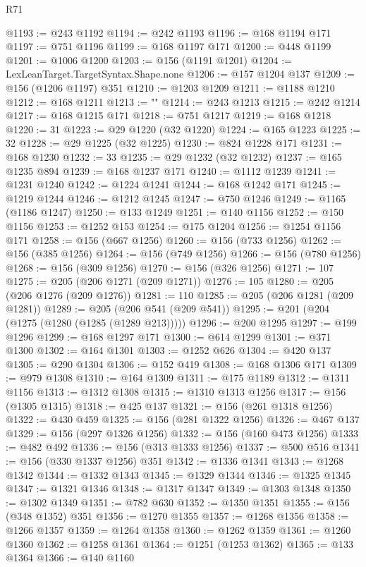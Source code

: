 \begin{lexlean}{R71}
\begin{coremodule}
{@1193 := @243 @1192
@1194 := @242 @1193
@1196 := @168 @1194 @171
@1197 := @751 @1196
@1199 := @168 @1197 @171
@1200 := @448 @1199
@1201 := @1006 @1200
@1203 := @156 (@1191 @1201)
@1204 := LexLeanTarget.TargetSyntax.Shape.none
@1206 := @157 @1204 @137
@1209 := @156 (@1206 @1197) @351
@1210 := @1203 @1209
@1211 := @1188 @1210
@1212 := @168 @1211
@1213 := "}"
@1214 := @243 @1213
@1215 := @242 @1214
@1217 := @168 @1215 @171
@1218 := @751 @1217
@1219 := @168 @1218
@1220 := 31
@1223 := @29 @1220 (@32 @1220)
@1224 := @165 @1223
@1225 := 32
@1228 := @29 @1225 (@32 @1225)
@1230 := @824 @1228 @171
@1231 := @168 @1230
@1232 := 33
@1235 := @29 @1232 (@32 @1232)
@1237 := @165 @1235 @894
@1239 := @168 @1237 @171
@1240 := @1112 @1239
@1241 := @1231 @1240
@1242 := @1224 @1241
@1244 := @168 @1242 @171
@1245 := @1219 @1244
@1246 := @1212 @1245
@1247 := @750 @1246
@1249 := @1165 (@1186 @1247)
@1250 := @133 @1249
@1251 := @140 @1156
@1252 := @150 @1156
@1253 := @1252 @153
@1254 := @175 @1204
@1256 := @1254 @1156 @171
@1258 := @156 (@667 @1256)
@1260 := @156 (@733 @1256)
@1262 := @156 (@385 @1256)
@1264 := @156 (@749 @1256)
@1266 := @156 (@780 @1256)
@1268 := @156 (@309 @1256)
@1270 := @156 (@326 @1256)
@1271 := 107
@1275 := @205 (@206 @1271 (@209 @1271))
@1276 := 105
@1280 := @205 (@206 @1276 (@209 @1276))
@1281 := 110
@1285 := @205 (@206 @1281 (@209 @1281))
@1289 := @205 (@206 @541 (@209 @541))
@1295 := @201 (@204 (@1275 (@1280 (@1285 (@1289 @213)))))
@1296 := @200 @1295
@1297 := @199 @1296
@1299 := @168 @1297 @171
@1300 := @614 @1299
@1301 := @371 @1300
@1302 := @164 @1301
@1303 := @1252 @626
@1304 := @420 @137
@1305 := @290 @1304
@1306 := @152 @419
@1308 := @168 @1306 @171
@1309 := @979 @1308
@1310 := @164 @1309
@1311 := @175 @1189
@1312 := @1311 @1156
@1313 := @1312 @1308
@1315 := @1310 @1313 @1256
@1317 := @156 (@1305 @1315)
@1318 := @425 @137
@1321 := @156 (@261 @1318 @1256)
@1322 := @430 @459
@1325 := @156 (@281 @1322 @1256)
@1326 := @467 @137
@1329 := @156 (@297 @1326 @1256)
@1332 := @156 (@160 @473 @1256)
@1333 := @482 @492
@1336 := @156 (@313 @1333 @1256)
@1337 := @500 @516
@1341 := @156 (@330 @1337 @1256) @351
@1342 := @1336 @1341
@1343 := @1268 @1342
@1344 := @1332 @1343
@1345 := @1329 @1344
@1346 := @1325 @1345
@1347 := @1321 @1346
@1348 := @1317 @1347
@1349 := @1303 @1348
@1350 := @1302 @1349
@1351 := @782 @630
@1352 := @1350 @1351
@1355 := @156 (@348 @1352) @351
@1356 := @1270 @1355
@1357 := @1268 @1356
@1358 := @1266 @1357
@1359 := @1264 @1358
@1360 := @1262 @1359
@1361 := @1260 @1360
@1362 := @1258 @1361
@1364 := @1251 (@1253 @1362)
@1365 := @133 @1364
@1366 := @140 @1160

\end{coremodule}
\end{lexlean}
